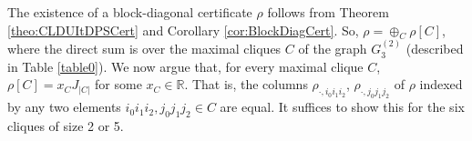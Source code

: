 \documentclass[11pt]{article}
\makeatletter
\newcommand{\R}{\ensuremath{\mathbb{R}}}   %
\theoremstyle{plain}
\renewenvironment{proof}[1][\proofname]{%
  \par
  \pushQED{}%
  \normalfont
  \topsep6\p@\@plus6\p@
  \trivlist
  \item[\hskip\labelsep\itshape #1\@addpunct{.}]%
}{%
  \popQED
  \endtrivlist
}
\makeatother
\begin{document}
\begin{proof}
    The existence of a block-diagonal certificate $\rho$ follows from Theorem \ref{theo:CLDUItDPSCert} and Corollary \ref{cor:BlockDiagCert}. So,  $\rho=\oplus_C \rho[C]$, where the direct sum is over the maximal cliques $C$ of the graph $G^{(2)}_3$ (described in Table \ref{table0}). We now argue that, for  every maximal clique $C$, $\rho[C]=x_C J_{|C|}$ for some   $x_C\in\R$. That is, the columns $\rho_{\cdot, i_0i_1i_2}$, $\rho_{\cdot,j_0j_1j_2}$ of $\rho$ indexed by any two elements $i_0i_1i_2,j_0j_1j_2\in C$ are equal. It suffices to show this for the 
    six cliques of size 2 or 5.
    




\end{proof}
\end{document}
